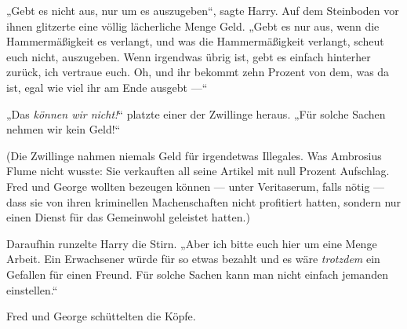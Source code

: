„Gebt es nicht aus, nur um es auszugeben“, sagte Harry. Auf dem Steinboden vor ihnen glitzerte eine völlig lächerliche Menge Geld.
„Gebt es nur aus, wenn die Hammermäßigkeit es verlangt, und was die Hammermäßigkeit verlangt, scheut euch nicht, auszugeben. Wenn irgendwas übrig ist, gebt es einfach hinterher zurück, ich vertraue euch. Oh, und ihr bekommt zehn Prozent von dem, was da ist, egal wie viel ihr am Ende ausgebt —“

„Das \emph{können wir nicht!}“ platzte einer der Zwillinge heraus.
„Für solche Sachen nehmen wir kein Geld!“

(Die Zwillinge nahmen niemals Geld für irgendetwas Illegales. Was Ambrosius Flume nicht wusste: Sie verkauften all seine Artikel mit null Prozent Aufschlag. Fred und George wollten bezeugen können — unter Veritaserum, falls nötig — dass sie von ihren kriminellen Machenschaften nicht profitiert hatten, sondern nur einen Dienst für das Gemeinwohl geleistet hatten.)

Daraufhin runzelte Harry die Stirn.
„Aber ich bitte euch hier um eine Menge Arbeit. Ein Erwachsener würde für so etwas bezahlt und es wäre \emph{trotzdem} ein Gefallen für einen Freund. Für solche Sachen kann man nicht einfach jemanden einstellen.“

Fred und George schüttelten die Köpfe.

